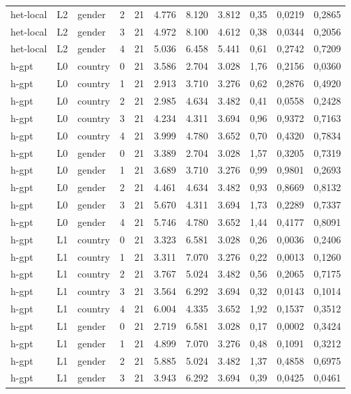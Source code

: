 \begin{landscape}
\begin{longtable}{lllrrrrrrrr}
het-local & L2 & gender & 2 & 21 & 4.776 & 8.120 & 3.812 & 0,35 & 0,0219 & 0,2865 \\
het-local & L2 & gender & 3 & 21 & 4.972 & 8.100 & 4.612 & 0,38 & 0,0344 & 0,2056 \\
het-local & L2 & gender & 4 & 21 & 5.036 & 6.458 & 5.441 & 0,61 & 0,2742 & 0,7209 \\
h-gpt & L0 & country & 0 & 21 & 3.586 & 2.704 & 3.028 & 1,76 & 0,2156 & 0,0360 \\
h-gpt & L0 & country & 1 & 21 & 2.913 & 3.710 & 3.276 & 0,62 & 0,2876 & 0,4920 \\
h-gpt & L0 & country & 2 & 21 & 2.985 & 4.634 & 3.482 & 0,41 & 0,0558 & 0,2428 \\
h-gpt & L0 & country & 3 & 21 & 4.234 & 4.311 & 3.694 & 0,96 & 0,9372 & 0,7163 \\
h-gpt & L0 & country & 4 & 21 & 3.999 & 4.780 & 3.652 & 0,70 & 0,4320 & 0,7834 \\
h-gpt & L0 & gender & 0 & 21 & 3.389 & 2.704 & 3.028 & 1,57 & 0,3205 & 0,7319 \\
h-gpt & L0 & gender & 1 & 21 & 3.689 & 3.710 & 3.276 & 0,99 & 0,9801 & 0,2693 \\
h-gpt & L0 & gender & 2 & 21 & 4.461 & 4.634 & 3.482 & 0,93 & 0,8669 & 0,8132 \\
h-gpt & L0 & gender & 3 & 21 & 5.670 & 4.311 & 3.694 & 1,73 & 0,2289 & 0,7337 \\
h-gpt & L0 & gender & 4 & 21 & 5.746 & 4.780 & 3.652 & 1,44 & 0,4177 & 0,8091 \\
h-gpt & L1 & country & 0 & 21 & 3.323 & 6.581 & 3.028 & 0,26 & 0,0036 & 0,2406 \\
h-gpt & L1 & country & 1 & 21 & 3.311 & 7.070 & 3.276 & 0,22 & 0,0013 & 0,1260 \\
h-gpt & L1 & country & 2 & 21 & 3.767 & 5.024 & 3.482 & 0,56 & 0,2065 & 0,7175 \\
h-gpt & L1 & country & 3 & 21 & 3.564 & 6.292 & 3.694 & 0,32 & 0,0143 & 0,1014 \\
h-gpt & L1 & country & 4 & 21 & 6.004 & 4.335 & 3.652 & 1,92 & 0,1537 & 0,3512 \\
h-gpt & L1 & gender & 0 & 21 & 2.719 & 6.581 & 3.028 & 0,17 & 0,0002 & 0,3424 \\
h-gpt & L1 & gender & 1 & 21 & 4.899 & 7.070 & 3.276 & 0,48 & 0,1091 & 0,3212 \\
h-gpt & L1 & gender & 2 & 21 & 5.885 & 5.024 & 3.482 & 1,37 & 0,4858 & 0,6975 \\
h-gpt & L1 & gender & 3 & 21 & 3.943 & 6.292 & 3.694 & 0,39 & 0,0425 & 0,0461 \\

\end{longtable}
\end{landscape}

